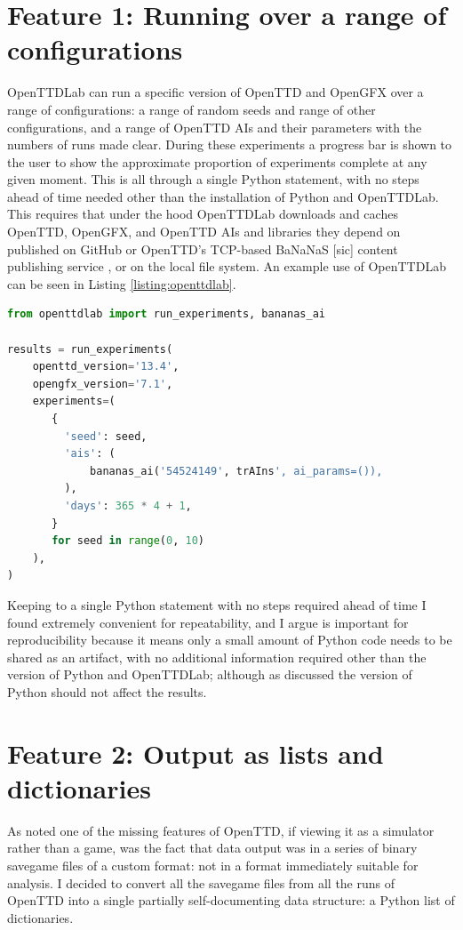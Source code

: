 \documentclass[logo,msc,dsti]{style/infthesis}    %
\begin{document}
{\section{Feature 1: Running over a range of configurations}

OpenTTDLab can run a specific version of OpenTTD and OpenGFX over a range of configurations: a range of random seeds and range of other configurations, and a range of OpenTTD AIs and their parameters with the numbers of runs made clear. During these experiments a progress bar is shown to the user to show the approximate proportion of experiments complete at any given moment. This is all through a single Python statement, with no steps ahead of time needed other than the installation of Python and OpenTTDLab. This requires that under the hood OpenTTDLab downloads and caches OpenTTD, OpenGFX, and OpenTTD AIs and libraries they depend on published on GitHub or OpenTTD's TCP-based BaNaNaS [sic] content publishing service \cite{OpenTTDBaNaNaS}, or on the local file system. An example use of OpenTTDLab can be seen in Listing \ref{listing:openttdlab}.

\begin{lstlisting}[label=listing:openttdlab,language=Python, caption={Example usage of OpenTTDLab that runs the trAIns AI automatically downloaded from BaNaNaS for a single year of in-game time for random seeds 0 to 9.}]
from openttdlab import run_experiments, bananas_ai

results = run_experiments(
    openttd_version='13.4',
    opengfx_version='7.1',
    experiments=(
       {
         'seed': seed,
         'ais': (
             bananas_ai('54524149', trAIns', ai_params=()),
         ),
         'days': 365 * 4 + 1,
       }
       for seed in range(0, 10)
    ),
)
\end{lstlisting}
%
Keeping to a single Python statement with no steps required ahead of time I found extremely convenient for repeatability, and I argue is important for reproducibility because it means only a small amount of Python code needs to be shared as an artifact, with no additional information required other than the version of Python and OpenTTDLab; although as discussed the version of Python should not affect the results.

\section{Feature 2: Output as lists and dictionaries}

As noted one of the missing features of OpenTTD, if viewing it as a simulator rather than a game, was the fact that data output was in a series of binary savegame files of a custom format: not in a format immediately suitable for analysis. I decided to convert all the savegame files from all the runs of OpenTTD into a single partially self-documenting data structure: a Python list of dictionaries.

}
\end{document}
